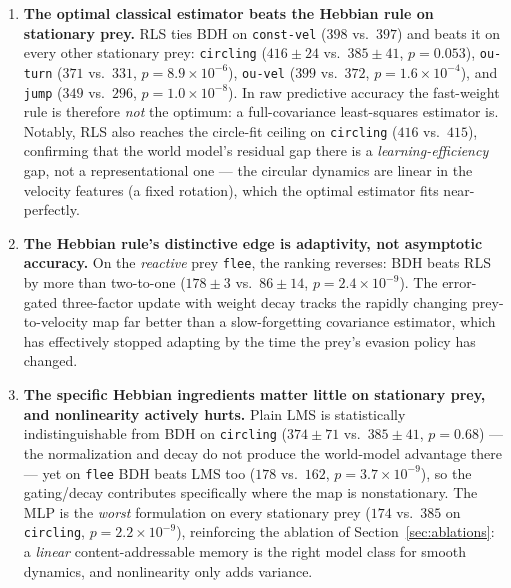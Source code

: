 \documentclass[11pt]{article}
\begin{document}
\begin{enumerate}
\item \textbf{The optimal classical estimator beats the Hebbian rule on stationary prey.} RLS
  ties BDH on \texttt{const-vel} ($398$ vs.\ $397$) and beats it on every other stationary prey:
  \texttt{circling} ($416 \pm 24$ vs.\ $385 \pm 41$, $p = 0.053$), \texttt{ou-turn}
  ($371$ vs.\ $331$, $p = 8.9 \times 10^{-6}$), \texttt{ou-vel} ($399$ vs.\ $372$,
  $p = 1.6 \times 10^{-4}$), and \texttt{jump} ($349$ vs.\ $296$, $p = 1.0 \times 10^{-8}$). In
  raw predictive accuracy the fast-weight rule is therefore \emph{not} the optimum: a
  full-covariance least-squares estimator is. Notably, RLS also reaches the circle-fit ceiling
  on \texttt{circling} ($416$ vs.\ $415$), confirming that the world model's residual gap there
  is a \emph{learning-efficiency} gap, not a representational one --- the circular dynamics are
  linear in the velocity features (a fixed rotation), which the optimal estimator fits
  near-perfectly.
\item \textbf{The Hebbian rule's distinctive edge is adaptivity, not asymptotic accuracy.} On
  the \emph{reactive} prey \texttt{flee}, the ranking reverses: BDH beats RLS by more than
  two-to-one ($178 \pm 3$ vs.\ $86 \pm 14$, $p = 2.4 \times 10^{-9}$). The error-gated
  three-factor update with weight decay tracks the rapidly changing prey-to-velocity map far
  better than a slow-forgetting covariance estimator, which has effectively stopped adapting by
  the time the prey's evasion policy has changed.
\item \textbf{The specific Hebbian ingredients matter little on stationary prey, and
  nonlinearity actively hurts.} Plain LMS is statistically indistinguishable from BDH on
  \texttt{circling} ($374 \pm 71$ vs.\ $385 \pm 41$, $p = 0.68$) --- the normalization and decay
  do not produce the world-model advantage there --- yet on \texttt{flee} BDH beats LMS too
  ($178$ vs.\ $162$, $p = 3.7 \times 10^{-9}$), so the gating/decay contributes specifically
  where the map is nonstationary. The MLP is the \emph{worst} formulation on every stationary
  prey ($174$ vs.\ $385$ on \texttt{circling}, $p = 2.2 \times 10^{-9}$), reinforcing the
  ablation of Section~\ref{sec:ablations}: a \emph{linear} content-addressable memory is the
  right model class for smooth dynamics, and nonlinearity only adds variance.
\end{enumerate}
\end{document}

